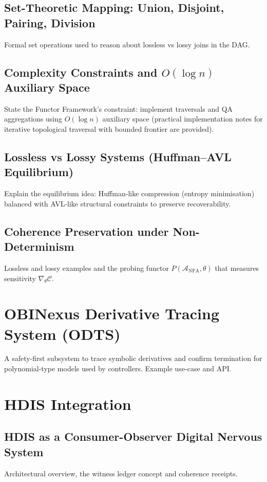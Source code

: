 \documentclass[12pt,a4paper]{article}
\begin{document}
\subsection{Set-Theoretic Mapping: Union, Disjoint, Pairing, Division}
Formal set operations used to reason about lossless vs lossy joins in the DAG.

\subsection{Complexity Constraints and \texorpdfstring{$O(\log n)$}{O(log n)} Auxiliary Space}
State the Functor Framework's constraint: implement traversals and QA
aggregations using $O(\log n)$ auxiliary space (practical implementation
notes for iterative topological traversal with bounded frontier are provided).

\subsection{Lossless vs Lossy Systems (Huffman--AVL Equilibrium)}
Explain the equilibrium idea: Huffman-like compression (entropy minimisation)
balanced with AVL-like structural constraints to preserve recoverability.

\subsection{Coherence Preservation under Non-Determinism}
Lossless and lossy examples and the probing functor $P(\mathcal{A}_{\mathrm{NFA}},\theta)$
that measures sensitivity $\nabla_\theta \mathcal{C}$.

\section{OBINexus Derivative Tracing System (ODTS)}
A safety-first subsystem to trace symbolic derivatives and confirm termination
for polynomial-type models used by controllers. Example use-case and API.

\section{HDIS Integration}
\subsection{HDIS as a Consumer-Observer Digital Nervous System}
Architectural overview, the witness ledger concept and coherence receipts.
\end{document}
